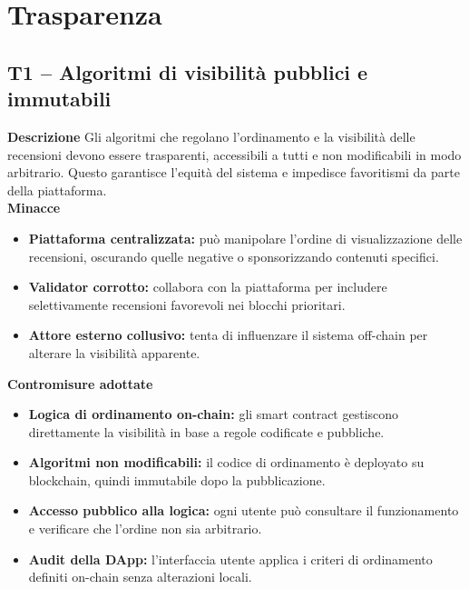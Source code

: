     \section{Trasparenza}
        \subsection{T1 – Algoritmi di visibilità pubblici e immutabili}
            \noindent \textbf{Descrizione}
                Gli algoritmi che regolano l'ordinamento e la visibilità delle recensioni devono essere trasparenti, accessibili a tutti e non modificabili in modo arbitrario. Questo garantisce l'equità del sistema e impedisce favoritismi da parte della piattaforma. \\

            \noindent \textbf{Minacce}
                \begin{itemize}
                    \item \textbf{Piattaforma centralizzata:} può manipolare l'ordine di visualizzazione delle recensioni, oscurando quelle negative o sponsorizzando contenuti specifici.

                    \item \textbf{Validator corrotto:} collabora con la piattaforma per includere selettivamente recensioni favorevoli nei blocchi prioritari.

                    \item \textbf{Attore esterno collusivo:} tenta di influenzare il sistema off-chain per alterare la visibilità apparente.
                \end{itemize}

            \noindent \textbf{Contromisure adottate}
                \begin{itemize}
                    \item \textbf{Logica di ordinamento on-chain:} gli smart contract gestiscono direttamente la visibilità in base a regole codificate e pubbliche.

                    \item \textbf{Algoritmi non modificabili:} il codice di ordinamento è deployato su blockchain, quindi immutabile dopo la pubblicazione.

                    \item \textbf{Accesso pubblico alla logica:} ogni utente può consultare il funzionamento e verificare che l'ordine non sia arbitrario.

                    \item \textbf{Audit della DApp:} l'interfaccia utente applica i criteri di ordinamento definiti on-chain senza alterazioni locali.
                \end{itemize}

